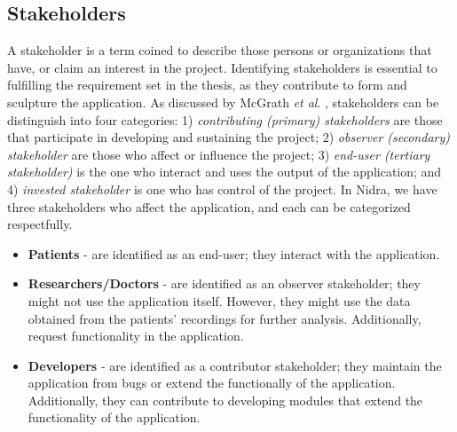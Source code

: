 \subsection{Stakeholders}
A stakeholder is a term coined to describe those persons or organizations that have, or claim an interest in the project. Identifying stakeholders is essential to fulfilling the requirement set in the thesis, as they contribute to form and sculpture the application. As discussed by McGrath \textit{et al}. \cite{stakeholderdefined}, stakeholders can be distinguish  into four categories: 1) \textit{contributing (primary) stakeholders} are those that participate in developing and sustaining the project; 2) \textit{observer (secondary) stakeholder} are those who affect or influence the project;  3) \textit{end-user (tertiary stakeholder)} is the one who interact and uses the output of the application; and 4) \textit{invested stakeholder} is one who has control of the project. In Nidra, we have three stakeholders who affect the application, and each can be categorized respectfully.
\begin{itemize}
    \item \textbf{Patients} - are identified as an end-user; they interact with the application.  
    \item \textbf{Researchers/Doctors} - are identified as an observer stakeholder; they might not use the application itself. However, they might use the data obtained from the patients' recordings for further analysis. Additionally, request functionality in the application.
    \item \textbf{Developers} - are identified as a contributor stakeholder; they maintain the application from bugs or extend the functionally of the application. Additionally, they can contribute to developing modules that extend the functionality of the application. 
\end{itemize}
